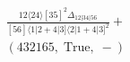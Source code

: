 \documentclass[varwidth, border=5pt]{standalone}
\begin{document}
\begin{my}
$\begin{gathered}
\scriptscriptstyle\frac{12⟨24⟩[35]^2Δ_{12|34|56}}{[56]⟨1|2+4|3]⟨2|1+4|3]^2}+\\
\scriptscriptstyle(432165,\;\text{True},\;-)\phantom{+}
\end{gathered}$
\end{my}
\end{document}
